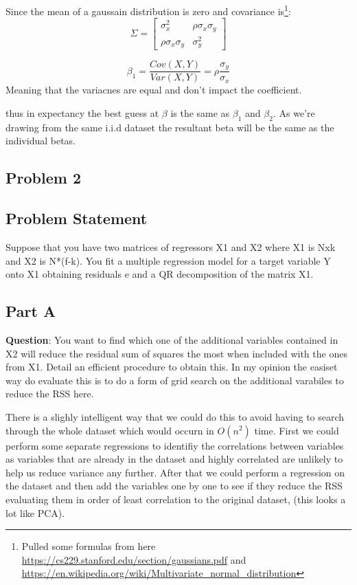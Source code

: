 \documentclass{article}
\begin{document}
Since the mean of a gaussain distribution is zero and covariance is\footnote[2]{Pulled some formulas from here \url{https://cs229.stanford.edu/section/gaussians.pdf} and \url{https://en.wikipedia.org/wiki/Multivariate_normal_distribution}}:
$$\Sigma = \begin{bmatrix} \sigma_{x}^2 & \rho\sigma_x\sigma_y\\ \rho\sigma_x\sigma_y & \sigma_{y}^2 \end{bmatrix}$$

$$ \beta_1 = \frac{Cov(X,Y)}{Var(X,Y)} = \rho \frac{\sigma_y}{\sigma_x}$$
Meaning that the variacnes are equal and don't impact the coefficient.

thus in expectancy the best guess at $\beta$ is the same as $\beta_1$ and $\beta_2$. 
As we're drawing from the same i.i.d dataset the resultant beta will be the same as the individual betas.


\subsection*{Problem 2}
\subsection*{Problem Statement}
Suppose that you have two matrices of regressors X1 and X2 where X1 is Nxk and X2 is N*(f-k). 
You fit a multiple regression model for a target variable Y onto X1 obtaining residuals e and a QR decomposition of the matrix X1. 
\subsection*{Part A}
\textbf{Question}: You want to find which one of the additional variables contained in X2 will reduce the residual sum of squares the most when included with the ones from X1. Detail an efficient procedure to obtain this. 
In my opinion the easiset way do evaluate this is to do a form of grid search on the additional varabiles to reduce the RSS here. 

There is a slighly intelligent way that we could do this to avoid having to search through the whole dataset which would occurn in $O(n^2)$ time.
First we could perform some separate regressions to identifiy the correlations between variables as variables that are already in the dataset and highly correlated are unlikely to help us reduce variance any further. 
After that we could perform a regression on the dataset and then add the variables one by one to see if they reduce the RSS evaluating them in order of least correlation to the original dataset, (this looks a lot like PCA). 
\end{document}

